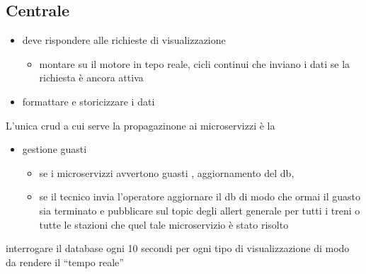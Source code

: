 \documentclass[11pt]{article}
\begin{document}
\subsection{Centrale}
\label{sec:org6d76551}
\begin{itemize}
\item deve rispondere alle richieste di visualizzazione
\begin{itemize}
\item montare su il motore in tepo reale, cicli continui che inviano i dati se la richiesta è ancora attiva
\end{itemize}
\item formattare e storicizzare i dati
\end{itemize}
L'unica crud a cui serve la propagazinone ai microservizzi è la
\begin{itemize}
\item gestione guasti
\begin{itemize}
\item se i microservizzi avvertono guasti , aggiornamento del db,
\item se il tecnico invia l'operatore aggiornare il db di modo che ormai il guasto sia terminato e
pubblicare sul topic degli allert generale per tutti i treni o tutte le stazioni che quel tale microservizio è stato risolto
\end{itemize}
\end{itemize}
interrogare il database ogni 10 secondi per ogni tipo di visualizzazione di modo da rendere il ``tempo reale''
\end{document}
